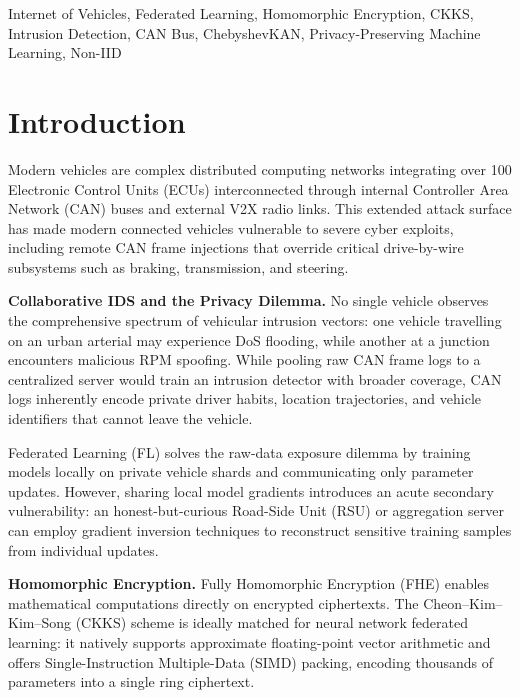 \documentclass[conference]{IEEEtran}
\begin{document}
\begin{IEEEkeywords}
Internet of Vehicles, Federated Learning, Homomorphic Encryption, CKKS,
Intrusion Detection, CAN Bus, ChebyshevKAN, Privacy-Preserving Machine
Learning, Non-IID
\end{IEEEkeywords}

\section{Introduction}

Modern vehicles are complex distributed computing networks integrating over
100 Electronic Control Units (ECUs) interconnected through internal
Controller Area Network (CAN) buses and external V2X radio links. This
extended attack surface has made modern connected vehicles vulnerable to
severe cyber exploits, including remote CAN frame injections that override
critical drive-by-wire subsystems such as braking, transmission, and steering.

\textbf{Collaborative IDS and the Privacy Dilemma.}
No single vehicle observes the comprehensive spectrum of vehicular intrusion
vectors: one vehicle travelling on an urban arterial may experience DoS flooding,
while another at a junction encounters malicious RPM spoofing. While pooling
raw CAN frame logs to a centralized server would train an intrusion detector
with broader coverage, CAN logs inherently encode private driver habits,
location trajectories, and vehicle identifiers that cannot leave the vehicle.

Federated Learning (FL) solves the raw-data exposure dilemma by training
models locally on private vehicle shards and communicating only parameter
updates. However, sharing local model gradients introduces an acute secondary
vulnerability: an honest-but-curious Road-Side Unit (RSU) or aggregation server
can employ gradient inversion techniques to reconstruct sensitive training
samples from individual updates.

\textbf{Homomorphic Encryption.}
Fully Homomorphic Encryption (FHE) enables mathematical computations
directly on encrypted ciphertexts. The Cheon--Kim--Kim--Song (CKKS) scheme is
ideally matched for neural network federated learning: it natively supports
approximate floating-point vector arithmetic and offers Single-Instruction
Multiple-Data (SIMD) packing, encoding thousands of parameters into a single
ring ciphertext.
\end{document}
